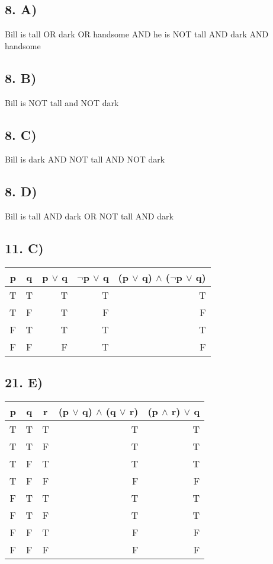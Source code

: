 \documentclass[]{article}
\begin{document}
\subsection*{8. A)}
Bill is tall OR dark OR handsome AND he is NOT tall AND dark AND handsome
\subsection*{8. B)}
Bill is NOT tall and NOT dark
\subsection*{8. C)}
Bill is dark AND NOT tall AND NOT dark
\subsection*{8. D)}
Bill is tall AND dark OR NOT tall AND dark
\subsection*{11. C)}
\begin{tabular}{ | c | c || r || r || r || }
 p & q & p $\vee$ q &$\neg$p $\vee$ q & (p $\vee$ q) $\wedge$ ($\neg$p $\vee$ q)  \\
  \hline
  T & T & T & T & T\\   
  T & F & T & F & F\\   
  F & T & T & T & T\\           
  F & F & F & T & F\\                                             
  \hline  
\end{tabular}
\subsection*{21. E)}
\begin{tabular}{| c | c | c || r || r ||}
 p & q & r & (p $\vee$ q) $\wedge$ (q $\vee$ r) &(p  $\wedge$ r)  $\vee$ q  \\
  \hline                        
  T & T & T & T & T \\
  T & T & F & T & T \\
  T & F & T & T & T \\
  T & F & F & F & F \\
  F & T & T & T & T \\
  F & T & F & T & T \\
  F & F & T & F & F \\
  F & F & F & F & F \\

  \hline  
\end{tabular}
\end{document}

